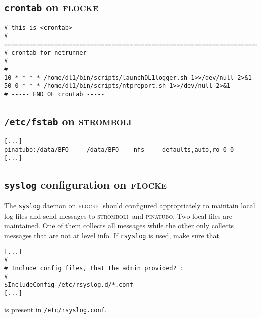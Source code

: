 \documentclass[twoside]{article}
\newcommand{\Dloggerhost}{\textsc{flocke}}
\newcommand{\Dstoragehost}{\textsc{pinatubo}}
\newcommand{\Ddisplayhost}{\textsc{stromboli}}
\begin{document}
\subsection{\texttt{crontab} on \Dloggerhost}
\label{sec:conf:crontab:logger}
\begin{verbatim}
# this is <crontab>
# ============================================================================
# crontab for netrunner
# ---------------------
# 
10 * * * * /home/dl1/bin/scripts/launchDL1logger.sh 1>>/dev/null 2>&1
50 0 * * * /home/dl1/bin/scripts/ntpreport.sh 1>>/dev/null 2>&1
# ----- END OF crontab ----- 
\end{verbatim}
\subsection{\texttt{/etc/fstab} on \Ddisplayhost}
\label{sec:conf:fstab:display}
\begin{verbatim}
[...]
pinatubo:/data/BFO     /data/BFO    nfs     defaults,auto,ro 0 0
[...]
\end{verbatim}
\subsection{\texttt{syslog} configuration on \Dloggerhost}
The \texttt{syslog} daemon on \Dloggerhost\ should configured appropriately 
to maintain local log files and send messages to \Ddisplayhost\ and
\Dstoragehost.
Two local files are maintained. 
One of them collects all messages while the other only collects messages that
are not at level info.
If \texttt{rsyslog} is used, make sure that
\begin{verbatim}
[...]
#
# Include config files, that the admin provided? :
#
$IncludeConfig /etc/rsyslog.d/*.conf
[...]
\end{verbatim}
is present in \texttt{/etc/rsyslog.conf}.
\end{document}
